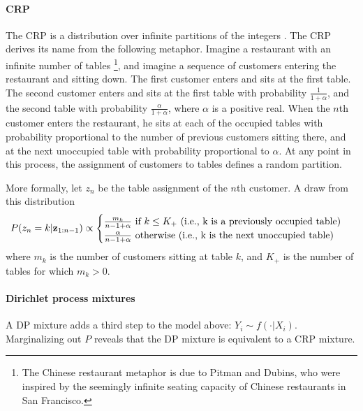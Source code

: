 \paragraph{\acrlong{CRP}}
The \gls{CRP} is a distribution over infinite partitions of the integers \cite{PitmanCRP,AldousCRP}.
The \gls{CRP} derives its name from the following metaphor. Imagine a restaurant with an infinite number of tables \footnote{The Chinese restaurant metaphor is due to Pitman and Dubins, who were inspired by the seemingly infinite seating capacity of Chinese restaurants in San Francisco.}, and imagine a sequence of customers entering the restaurant and sitting down. The first customer enters and sits at the first table. The second customer enters and sits at the first table with probability $\frac{1}{1+\alpha}$, and the second table with probability $\frac{\alpha}{1+\alpha}$, where $\alpha$ is a positive real. When the $n$th customer enters the restaurant, he sits at each of the occupied tables with probability proportional to the number of previous customers sitting there, and at the next unoccupied table with probability proportional to $\alpha$. At any point in this process, the assignment of customers to tables defines a random partition.

More formally, let $z_n$ be the table assignment of the $n$th customer. A draw from this distribution
\begin{equation*}
P(z_n = k | \mbz_{1:n-1})
\propto \begin{cases} \frac{m_k}{n-1+\alpha} \ \text{if} \ k \le K_+\ \text{(i.e., k is a previously occupied table)} \\ 
 \frac{\alpha}{n-1+\alpha} \ \text{otherwise} \ \text{(i.e., k is the next unoccupied table)} \end{cases}
\end{equation*}
where $m_k$ is the number of customers sitting at table $k$, and $K_+$ is the number of tables for which $m_k > 0$.

\paragraph{Dirichlet process mixtures}
A \gls{DP} mixture adds a third step to the model above: $Y_i \sim f(\cdot|X_i)$. Marginalizing out $P$ reveals that the \gls{DP} mixture is equivalent to a CRP mixture.


